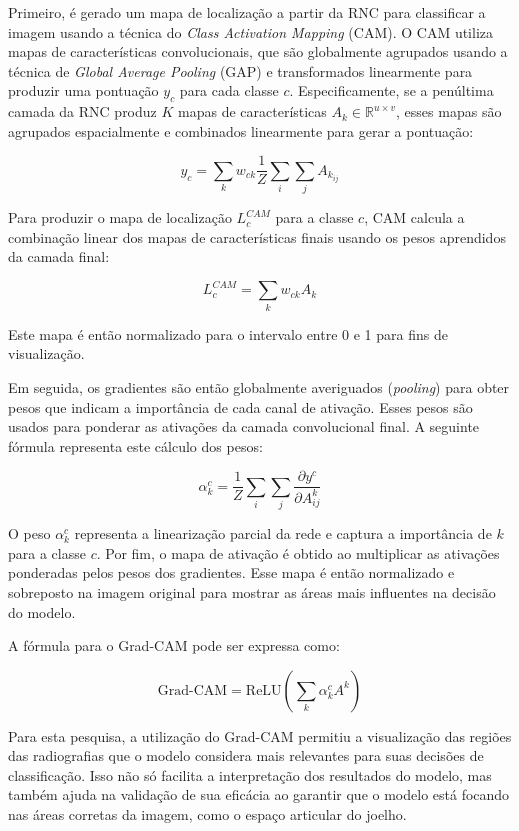Primeiro, é gerado um mapa de localização a partir da RNC para classificar a imagem usando a técnica do \textit{Class Activation Mapping} (CAM). O CAM utiliza mapas de características convolucionais, que são globalmente agrupados usando a técnica de \textit{Global Average Pooling} (GAP) e transformados linearmente para produzir uma pontuação \( y_c \) para cada classe \( c \). Especificamente, se a penúltima camada da RNC produz \( K \) mapas de características \( A_k \in \mathbb{R}^{u \times v} \), esses mapas são agrupados espacialmente e combinados linearmente para gerar a pontuação:

\[
y_c = \sum_k w_{ck} \frac{1}{Z} \sum_i \sum_j A_{k_{ij}}
\]

Para produzir o mapa de localização \( L_c^{CAM} \) para a classe \( c \), CAM calcula a combinação linear dos mapas de características finais usando os pesos aprendidos da camada final:

\[
L_c^{CAM} = \sum_k w_{ck} A_k
\]

Este mapa é então normalizado para o intervalo entre 0 e 1 para fins de visualização.

Em seguida, os gradientes são então globalmente averiguados (\textit{pooling}) para obter pesos que indicam a importância de cada canal de ativação. Esses pesos são usados para ponderar as ativações da camada convolucional final. A seguinte fórmula representa este cálculo dos pesos:

\[
\alpha_{k}^{c} = \frac{1}{Z} \sum_i \sum_j \frac{\partial y^{c}}{\partial A_{ij}^{k}}
\]

O peso \( \alpha_{k}^{c} \) representa a linearização parcial da rede e captura a importância de \(k \) para a classe \(c \). Por fim, o mapa de ativação é obtido ao multiplicar as ativações ponderadas pelos pesos dos gradientes. Esse mapa é então normalizado e sobreposto na imagem original para mostrar as áreas mais influentes na decisão do modelo.

A fórmula para o Grad-CAM pode ser expressa como:

\[
\text{Grad-CAM} = \text{ReLU} \left( \sum_{k} \alpha_{k}^{c} A^{k} \right)
\]

Para esta pesquisa, a utilização do Grad-CAM permitiu a visualização das regiões das radiografias que o modelo considera mais relevantes para suas decisões de classificação. Isso não só facilita a interpretação dos resultados do modelo, mas também ajuda na validação de sua eficácia ao garantir que o modelo está focando nas áreas corretas da imagem, como o espaço articular do joelho.